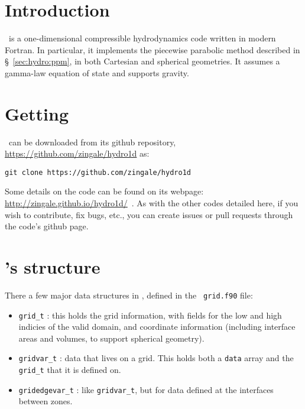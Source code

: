 \label{app:hydro1d}


\section{Introduction}

\hydrooned\ is a one-dimensional compressible hydrodynamics code written
in modern Fortran.  In particular, it implements the piecewise parabolic
method described in \S~\ref{sec:hydro:ppm}, in both Cartesian and spherical
geometries.  It assumes a gamma-law equation of state and supports gravity.


\section{Getting \hydrooned}

\hydrooned\ can be downloaded from its github repository, \url{https://github.com/zingale/hydro1d} as:
\begin{verbatim}
git clone https://github.com/zingale/hydro1d
\end{verbatim}

Some details on the code can be found on its webpage:
\url{http://zingale.github.io/hydro1d/}\, .  As with the other codes detailed here,
if you wish to contribute, fix bugs, etc., you can create issues or pull requests
through the code's github page.



\section{\hydrooned 's structure}

There a few major data structures in \hydrooned, defined in the {\tt
  grid.f90} file:

\begin{itemize}
\item {\tt grid\_t} : this holds the grid information, with fields for
  the low and high indicies of the valid domain, and coordinate
  information (including interface areas and volumes, to support
  spherical geometry).

\item {\tt gridvar\_t} : data that lives on a grid.  This holds both
  a {\tt data} array and the {\tt grid\_t} that it is defined on.
  
\item {\tt gridedgevar\_t} : like {\tt gridvar\_t}, but for data
  defined at the interfaces between zones.

\end{itemize}

